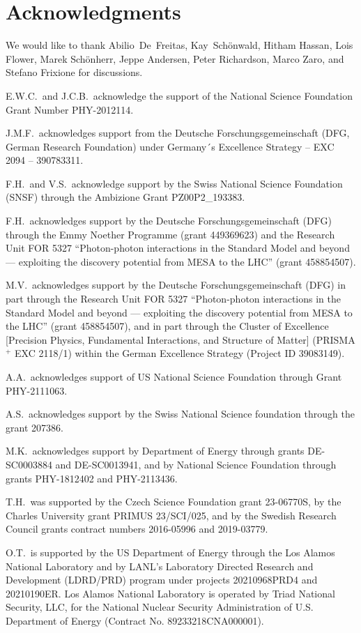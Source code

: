 \documentclass[pdflatex,sn-mathphys,Numbered,iicol]{sn-jnl}
\begin{document}
\clearpage

\section{Acknowledgments}

We would like to thank Abilio~De~Freitas, Kay~Sch\"onwald, Hitham Hassan, Lois Flower, Marek Sch\"onherr, Jeppe Andersen, Peter Richardson, Marco Zaro, and Stefano Frixione for discussions.

E.W.C.~and J.C.B.~acknowledge the support of the National Science Foundation Grant Number PHY-2012114.

J.M.F.~acknowledges support from  the Deutsche Forschungsgemeinschaft (DFG, German Research Foundation) under Germany´s Excellence Strategy – EXC 2094 – 390783311.

F.H.~and V.S.~acknowledge support by the Swiss National Science Foundation (SNSF) through the Ambizione Grant PZ00P2\_193383.

F.H.~acknowledges support by the Deutsche Forschungsgemeinschaft (DFG) through the Emmy Noether Programme (grant 449369623) and the Research Unit FOR 5327 “Photon-photon interactions in the Standard Model and beyond --- exploiting the discovery potential from MESA to the LHC” (grant 458854507).

M.V.~acknowledges support by the Deutsche Forschungsgemeinschaft (DFG) in part through the Research Unit FOR 5327 “Photon-photon interactions in the Standard Model and beyond --- exploiting the discovery potential from MESA to the LHC” (grant 458854507), 
and in part through the Cluster of Excellence [Precision Physics, Fundamental Interactions, and Structure of Matter] (PRISMA$^+$ EXC 2118/1) within the German Excellence Strategy (Project ID 39083149). 

A.A.~acknowledges support of US National Science Foundation through Grant PHY-2111063.

A.S.~acknowledges support by the Swiss National Science foundation through the grant 207386.

M.K.~acknowledges support by Department of Energy through grants DE-SC0003884 and DE-SC0013941, and by National Science Foundation through grants PHY-1812402 and PHY-2113436.

T.H.~was supported by the Czech Science Foundation grant 23-06770S, by the Charles University grant PRIMUS 23/SCI/025, and by the Swedish Research Council grants contract numbers 2016-05996 and 2019-03779.

O.T.~is supported by the US Department of Energy through the Los Alamos National Laboratory and by LANL’s Laboratory Directed Research and Development (LDRD/PRD) program under projects 20210968PRD4 and 20210190ER. Los Alamos National Laboratory is operated by Triad National Security, LLC, for the National Nuclear Security Administration of U.S. Department of Energy (Contract No. 89233218CNA000001).
\end{document}
